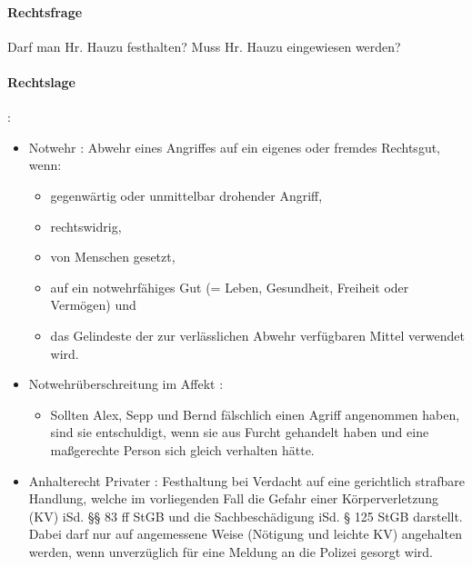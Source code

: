 \paragraph*{Rechtsfrage}
Darf man Hr. Hauzu festhalten? Muss Hr. Hauzu eingewiesen werden? 

\paragraph*{Rechtslage}

:

\begin{itemize}
\item Notwehr : Abwehr eines Angriffes
auf ein eigenes oder fremdes Rechtsgut, wenn:


\begin{itemize}
\item gegenwärtig oder unmittelbar drohender Angriff,
\item rechtswidrig,
\item von Menschen gesetzt,
\item auf ein notwehrfähiges Gut (= Leben, Gesundheit, Freiheit oder
Verm\"ogen) und
\item das Gelindeste der zur verlässlichen Abwehr verf\"ugbaren Mittel
verwendet wird.

\end{itemize}
\end{itemize}
\begin{itemize}
\item Notwehr\"uberschreitung im Affekt :
\begin{itemize}
\item {\mdseries
Sollten Alex, Sepp und Bernd fälschlich einen Agriff angenommen haben,
sind sie entschuldigt, wenn sie aus Furcht gehandelt haben und eine
ma{\ss}gerechte Person sich gleich verhalten hätte. }

\end{itemize}
\end{itemize}

\begin{itemize}
\item  Anhalterecht Privater :
Festhaltung bei Verdacht auf eine gerichtlich strafbare Handlung, welche im vorliegenden Fall
die Gefahr einer K\"orperverletzung (KV) iSd. {\S}{\S} 83 ff StGB und
die Sachbeschädigung iSd. {\S} 125 StGB darstellt. Dabei darf nur auf
angemessene Weise (N\"otigung und leichte KV) angehalten werden, wenn
unverz\"uglich f\"ur eine Meldung an die Polizei gesorgt wird.

\end{itemize}

